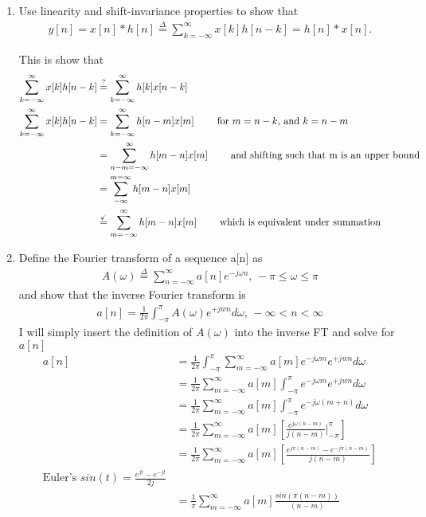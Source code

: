 \documentclass[12pt]{article}
\begin{document}
\begin{enumerate}[label=(\alph*)]
  \item Use linearity and shift-invariance properties to show that
\begin{align*}
  y[n]=x[n]*h[n]\stackrel{\Delta}{=}\sum_{k=-\infty}^\infty x[k]h[n-k]=h[n]*x[n].
\end{align*}

This is show that 
\begin{align*}
 \sum_{k=-\infty}^\infty x[k]h[n-k]&\stackrel{?}{=}\sum_{k=-\infty}^\infty h[k]x[n-k]\\
 \sum_{k=-\infty}^\infty x[k]h[n-k]&=\sum_{k=-\infty}^\infty h[n-m]x[m]\text{ \qquad for $m=n-k$, and $k=n-m$}\\
 &=\sum_{n-m=-\infty}^\infty h[m-n]x[m] \text{ \qquad and shifting such that m is an upper bound} \\
 &=\sum^{m=\infty}_{-\infty} h[m-n]x[m] \\
 &\stackrel{\checkmark}{=}\sum_{m=-\infty}^{\infty} h[m-n]x[m] \text{ \qquad which is equivalent under summation}\\
\end{align*}




  \item Define the Fourier transform of a sequence a[n] as 
\begin{align*}
  A(\omega)\stackrel{\Delta}{=}\sum_{n=-\infty}^\infty a[n]e^{-j\omega n}\text{,   } 
-\pi \leq \omega \leq \pi
\end{align*}
and show that the inverse Fourier transform is
\begin{align*}
  a[n]=\frac{1}{2\pi}\int_{-\pi}^\pi A(\omega)e^{+jwn}d\omega\text{,   }-\infty<n<\infty
\end{align*}
I will simply insert the definition of $A(\omega)$ into the inverse FT and solve for $a[n]$
\begin{align*}
  a[n]&=\frac{1}{2\pi}\int_{-\pi}^\pi     \sum_{m=-\infty}^\infty a[m]e^{-j\omega m}             e^{+jwn}d\omega\\
  &=\frac{1}{2\pi}\sum_{m=-\infty}^\infty a[m]     \int_{-\pi}^\pi     e^{-j\omega m}             e^{+jwn}d\omega\\
  &=\frac{1}{2\pi}\sum_{m=-\infty}^\infty a[m]     \int_{-\pi}^\pi     e^{-j\omega (m +n)}d\omega\\
  &=\frac{1}{2\pi}\sum_{m=-\infty}^\infty a[m]         \left[ \frac{e^{j\omega (n-m)}}{j(n-m)}\big|_{-\pi}^\pi\right]\\
  &=\frac{1}{2\pi}\sum_{m=-\infty}^\infty a[m]         \left[ \frac{e^{j\pi (n-m)} -   e^{-j\pi (n-m)}}{j(n-m)}\right]\\
\text{Euler's  }sin(t)=\frac{e^{jt}-e^{-jt}}{2j}\\
  &=\frac{1}{\pi}\sum_{m=-\infty}^\infty a[m]         \frac{sin(\pi(n-m))}{(n-m)}\\
\end{align*}


\end{enumerate}
\end{document}

